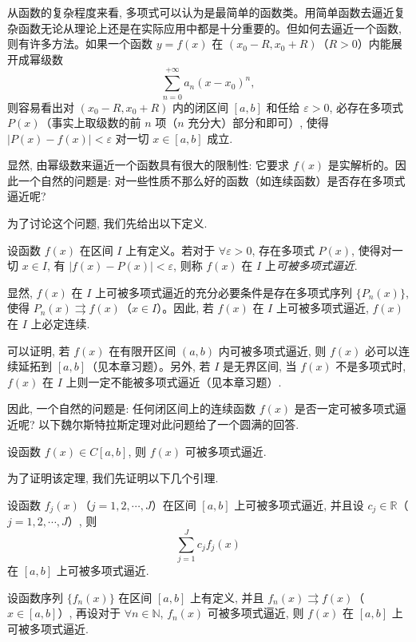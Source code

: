 从函数的复杂程度来看, 多项式可以认为是最简单的函数类。用简单函数去逼近复杂函数无论从理论上还是在实际应用中都是十分重要的。但如何去逼近一个函数, 则有许多方法。如果一个函数 $y=f(x)$ 在 $(x_0-R,x_0+R)$（$R>0$）内能展开成幂级数
\[
  \sum_{n=0}^{+\infty}a_n(x-x_0)^n,
\]
则容易看出对 $(x_0-R,x_0+R)$ 内的闭区间 $[a,b]$ 和任给 $\varepsilon>0$, 必存在多项式 $P(x)$（事实上取级数的前 $n$ 项（$n$ 充分大）部分和即可）, 使得 $|P(x)-f(x)|<\varepsilon$ 对一切 $x\in[a,b]$ 成立.

显然, 由幂级数来逼近一个函数具有很大的限制性: 它要求 $f(x)$ 是实解析的。因此一个自然的问题是: 对一些性质不那么好的函数（如连续函数）是否存在多项式逼近呢?

为了讨论这个问题, 我们先给出以下定义.

\begin{definition}\label{definition:ma-11-4-1}
设函数 $f(x)$ 在区间 $I$ 上有定义。若对于 $\forall\varepsilon>0$, 存在多项式 $P(x)$, 使得对一切 $x\in I$, 有 $|f(x)-P(x)|<\varepsilon$, 则称 $f(x)$ 在 $I$ 上\emph{可被多项式逼近}.
\end{definition}

显然, $f(x)$ 在 $I$ 上可被多项式逼近的充分必要条件是存在多项式序列 $\{P_n(x)\}$, 使得 $P_n(x)\rightrightarrows f(x)$（$x\in I$）。因此, 若 $f(x)$ 在 $I$ 上可被多项式逼近, $f(x)$ 在 $I$ 上必定连续.

可以证明, 若 $f(x)$ 在有限开区间 $(a,b)$ 内可被多项式逼近, 则 $f(x)$ 必可以连续延拓到 $[a,b]$（见本章习题）。另外, 若 $I$ 是无界区间, 当 $f(x)$ 不是多项式时, $f(x)$ 在 $I$ 上则一定不能被多项式逼近（见本章习题）.

因此, 一个自然的问题是: 任何闭区间上的连续函数 $f(x)$ 是否一定可被多项式逼近呢? 以下魏尔斯特拉斯定理对此问题给了一个圆满的回答.

\begin{theorem}[{魏尔斯特拉斯定理}]\label{theorem:ma-11-4-1}
设函数 $f(x)\in C[a,b]$, 则 $f(x)$ 可被多项式逼近.
\end{theorem}

为了证明该定理, 我们先证明以下几个引理.

\begin{lemma}\label{lemma:ma-11-4-2}
设函数 $f_j(x)$（$j=1,2,\cdots,J$）在区间 $[a,b]$ 上可被多项式逼近, 并且设 $c_j\in\mathbb R$（$j=1,2,\cdots,J$）, 则
\[
  \sum_{j=1}^{J}c_jf_j(x)
\]
在 $[a,b]$ 上可被多项式逼近.
\end{lemma}


\begin{lemma}\label{lemma:ma-11-4-3}
设函数序列 $\{f_n(x)\}$ 在区间 $[a,b]$ 上有定义, 并且 $f_n(x)\rightrightarrows f(x)$（$x\in[a,b]$）, 再设对于 $\forall n\in\mathbb N$, $f_n(x)$ 可被多项式逼近, 则 $f(x)$ 在 $[a,b]$ 上可被多项式逼近.
\end{lemma}

